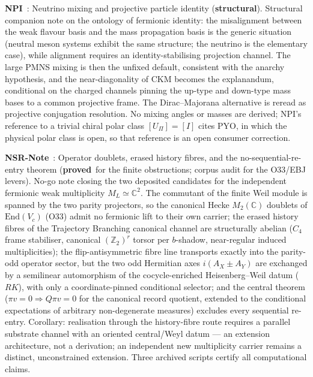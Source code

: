 \documentclass[11pt,a4paper]{article}
\newcommand{\sproved}{\textcolor{cproved}{\textbf{proved}}}
\newcommand{\sstruct}{\textcolor{cstruct}{\textbf{structural}}}
\begin{document}
    \textbf{NPI}~\cite{Beau2026npi}: Neutrino mixing and projective particle identity (\sstruct).
    Structural companion note on the ontology of fermionic identity: the misalignment between the weak flavour
    basis and the mass propagation basis is the generic situation (neutral meson systems exhibit the same
    structure; the neutrino is the elementary case), while alignment requires an identity-stabilising projection
    channel.
    The large PMNS mixing is then the unfixed default, consistent with the anarchy hypothesis, and the
    near-diagonality of CKM becomes the explanandum, conditional on the charged channels pinning the up-type and
    down-type mass bases to a common projective frame.
    The Dirac--Majorana alternative is reread as projective conjugation resolution.
    No mixing angles or masses are derived; NPI's reference to a trivial chiral polar class $[U_\Pi]=[I]$ cites PYO,
    in which the physical polar class is open, so that reference is an open consumer correction.

    \textbf{NSR-Note}~\cite{Beau2026nsr}: Operator doublets, erased history fibres, and the
    no-sequential-re-entry theorem (\sproved\ for the finite obstructions; corpus audit for
    the O33/EBJ levers).
    No-go note closing the two deposited candidates for the independent fermionic weak
    multiplicity $M_L \simeq \mathbb{C}^2$.
    The commutant of the finite Weil module is spanned by the two parity projectors, so the
    canonical Hecke $M_2(\mathbb{C})$ doublets of $\mathrm{End}(V_c)$ (O33) admit no
    fermionic lift to their own carrier; the erased history fibres of the Trajectory
    Branching canonical channel are structurally abelian ($C_4$ frame stabiliser, canonical
    $(\mathbb{Z}_2)^r$ torsor per $b$-shadow, near-regular induced multiplicities); the
    flip-antisymmetric fibre line transports exactly into the parity-odd operator sector,
    but the two odd Hermitian axes $i(A_X \pm A_Y)$ are exchanged by a semilinear
    automorphism of the cocycle-enriched Heisenberg--Weil datum ($RK$), with only a
    coordinate-pinned conditional selector; and the central theorem
    ($\pi v = 0 \Rightarrow Q\pi v = 0$ for the canonical record quotient, extended to the
    conditional expectations of arbitrary non-degenerate measures) excludes every sequential
    re-entry.
    Corollary: realisation through the history-fibre route requires a parallel substrate
    channel with an oriented central/Weyl datum --- an extension architecture, not a
    derivation; an independent new multiplicity carrier remains a distinct, unconstrained
    extension.
    Three archived scripts certify all computational claims.
\end{document}
